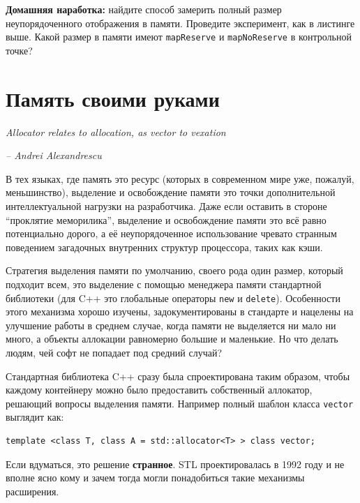 \documentclass[a4paper,12pt,oneside]{book}
\begin{document}
\textbf{Домашняя наработка:} найдите способ замерить полный размер неупорядоченного отображения в памяти. Проведите эксперимент, как в листинге выше. Какой размер в памяти имеют \lstinline!mapReserve! и \lstinline!mapNoReserve! в контрольной точке?


\pagebreak
\section{Память своими руками}\label{allocators}

\hfill\textit{Allocator relates to allocation, as vector to vexation}{\vspace{0.5em}}

\hfill\textit{-- Andrei Alexandrescu}

В тех языках, где память это ресурс (которых в современном мире уже, пожалуй, меньшинство), выделение и освобождение памяти это точки дополнительной интеллектуальной нагрузки на разработчика. Даже если оставить в стороне ``проклятие меморилика'', выделение и освобождение памяти это всё равно потенциально дорого, а её неупорядоченное использование чревато странным поведением загадочных внутренних структур процессора, таких как кэши.

Стратегия выделения памяти по умолчанию, своего рода один размер, который подходит всем, это выделение с помощью менеджера памяти стандартной библиотеки (для C++ это глобальные операторы \lstinline!new! и \lstinline!delete!). Особенности этого механизма хорошо изучены, задокументированы в стандарте и нацелены на улучшение работы в среднем случае, когда памяти не выделяется ни мало ни много, а объекты аллокации равномерно большие и маленькие. Но что делать людям, чей софт не попадает под средний случай?

Стандартная библиотека C++ сразу была спроектирована таким образом, чтобы каждому контейнеру можно было предоставить собственный аллокатор, решающий вопросы выделения памяти. Например полный шаблон класса \lstinline!vector! выглядит как:

\begin{lstlisting}
template <class T, class A = std::allocator<T> > class vector;
\end{lstlisting}

Если вдуматься, это решение \textbf{странное}. STL проектировалась в 1992 году и не вполне ясно кому и зачем тогда могли понадобиться такие механизмы расширения.
\end{document}
